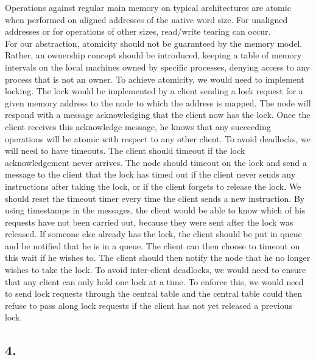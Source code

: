 \documentclass[12pt]{article}
\begin{document}
Operations against regular main memory on typical architectures are atomic when performed on aligned addresses of the native word size. For unaligned addresses or for operations of other sizes, read/write tearing can occur. \\
For our abstraction, atomicity should not be guaranteed by the memory model. Rather, an ownership concept should be introduced, keeping a table of memory intervals on the local machines owned by specific processes, denying access to any process that is not an owner. To achieve atomicity, we would need to implement locking. The lock would be implemented by a client sending a lock request for a given memory address to the node to which the address is mapped. The node will respond with a message acknowledging that the client now has the lock. Once the client receives this acknowledge message, he knows that any succeeding operations will be atomic with respect to any other client. To avoid deadlocks, we will need to have timeouts. The client should timeout if the lock acknowledgement never arrives. The node should timeout on the lock and send a message to the client that the lock has timed out if the client never sends any instructions after taking the lock, or if the client forgets to release the lock. We should reset the timeout timer every time the client sends a new instruction. By using timestamps in the messages, the client would be able to know which of his requests have not been carried out, because they were sent after the lock was released. If someone else already has the lock, the client should be put in queue and be notified that he is in a queue. The client can then choose to timeout on this wait if he wishes to. The client should then notify the node that he no longer wishes to take the lock. To avoid inter-client deadlocks, we would need to ensure that any client can only hold one lock at a time. To enforce this, we would need to send lock requests through the central table and the central table could then refuse to pass along lock requests if the client has not yet released a previous lock.

\subsection*{4.} %
\end{document}
